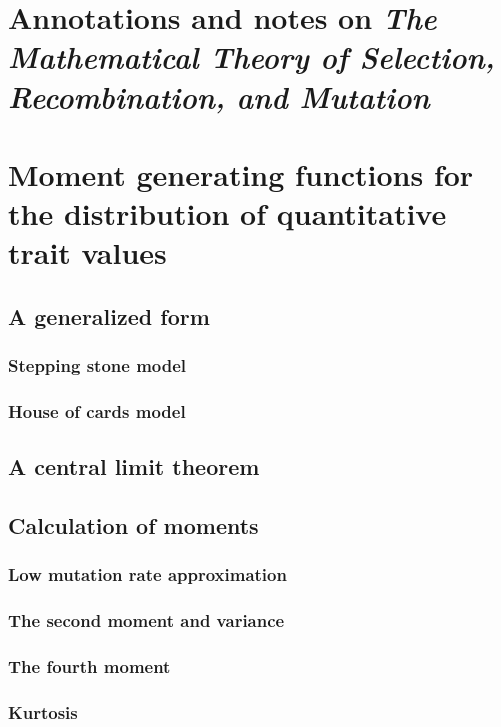 \documentclass{article}
\begin{document}
\section{Annotations and notes on \emph{The Mathematical Theory of Selection, Recombination, and Mutation} \citep{burger2000mathematical}}
\subsection{\citet[chap. 4]{burger2000mathematical}}


\section{Moment generating functions for the distribution of quantitative trait values}
\subsection{A generalized form}
\subsubsection{Stepping stone model}

\subsubsection{House of cards model}

\subsection{A central limit theorem}

\subsection{Calculation of moments}
\subsubsection{Low mutation rate approximation}

\subsubsection{The second moment and variance}

\subsubsection{The fourth moment}

\subsubsection{Kurtosis}

\end{document}
